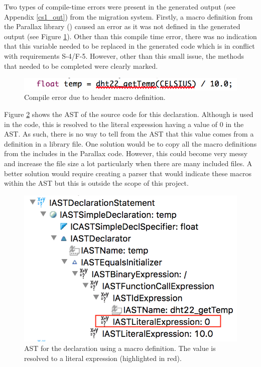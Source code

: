 \documentclass{UoYCSproject}
\begin{document}
Two types of compile-time errors were present in the generated output (see Appendix \ref{cs1_out}) from the migration system. Firstly, a macro definition from the Parallax  library () caused an error as it was not defined in the generated output (see Figure \ref{fig:celsius_error}). Other than this compile time error, there was no indication that this variable needed to be replaced in the generated code which is in conflict with requirements S-4/F-5. However, other than this small issue, the methods that needed to be completed were clearly marked.
\begin{figure}[h!]
  \centering
  \includegraphics[width=0.7\linewidth]{graphics/celsius_error.png}
  \caption{Compile error due to header macro definition.}
  \label{fig:celsius_error}
\end{figure}

Figure \ref{fig:celsius_ast} shows the AST of the source code for this declaration. Although  is used in the code, this is resolved to the literal expression having a value of $0$ in the AST. As such, there is no way to tell from the AST that this value comes from a definition in a library file. One solution would be to copy all the macro definitions from the includes in the Parallax code. However, this could become very messy and increase the file size a lot particularly when there are many included files. A better solution would require creating a parser that would indicate these macros within the AST but this is outside the scope of this project.

\begin{figure}[h!]
  \centering
  \includegraphics[width=0.5\linewidth]{graphics/celsius_ast.png}
  \caption{AST for the declaration using a macro definition. The value is resolved to a literal expression (highlighted in red).}
  \label{fig:celsius_ast}
\end{figure}
\end{document}
